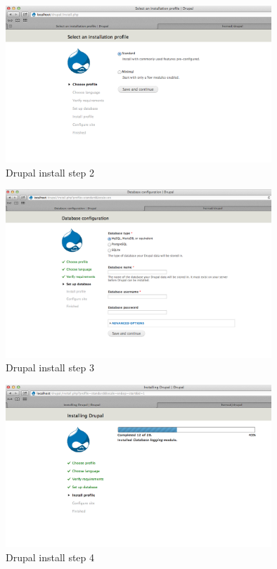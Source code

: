\documentclass[times, utf8, seminar]{fit}
\begin{document}
{{{\begin{figure}[H]
\centering
\includegraphics[width=10cm]{img/drupal_install_2.png}
\caption{Drupal install step 2}
\end{figure}

\begin{figure}[H]
\centering
\includegraphics[width=10cm]{img/drupal_install_3.png}
\caption{Drupal install step 3}
\end{figure}

\begin{figure}[H]
\centering
\includegraphics[width=10cm]{img/drupal_install_4.png}
\caption{Drupal install step 4}
\end{figure}

}}}
\end{document}
